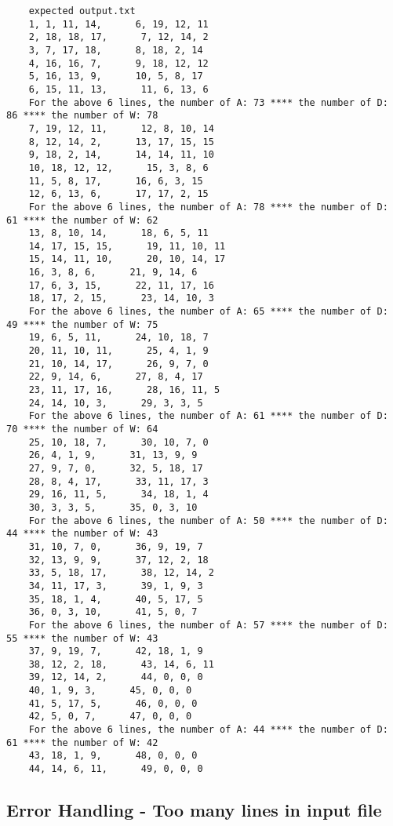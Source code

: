 \documentclass[]{article}
\begin{document}
	\begin{lstlisting}
	expected output.txt
	1, 1, 11, 14,      6, 19, 12, 11
	2, 18, 18, 17,      7, 12, 14, 2
	3, 7, 17, 18,      8, 18, 2, 14
	4, 16, 16, 7,      9, 18, 12, 12
	5, 16, 13, 9,      10, 5, 8, 17
	6, 15, 11, 13,      11, 6, 13, 6
	For the above 6 lines, the number of A: 73 **** the number of D: 86 **** the number of W: 78
	7, 19, 12, 11,      12, 8, 10, 14
	8, 12, 14, 2,      13, 17, 15, 15
	9, 18, 2, 14,      14, 14, 11, 10
	10, 18, 12, 12,      15, 3, 8, 6
	11, 5, 8, 17,      16, 6, 3, 15
	12, 6, 13, 6,      17, 17, 2, 15
	For the above 6 lines, the number of A: 78 **** the number of D: 61 **** the number of W: 62
	13, 8, 10, 14,      18, 6, 5, 11
	14, 17, 15, 15,      19, 11, 10, 11
	15, 14, 11, 10,      20, 10, 14, 17
	16, 3, 8, 6,      21, 9, 14, 6
	17, 6, 3, 15,      22, 11, 17, 16
	18, 17, 2, 15,      23, 14, 10, 3
	For the above 6 lines, the number of A: 65 **** the number of D: 49 **** the number of W: 75
	19, 6, 5, 11,      24, 10, 18, 7
	20, 11, 10, 11,      25, 4, 1, 9
	21, 10, 14, 17,      26, 9, 7, 0
	22, 9, 14, 6,      27, 8, 4, 17
	23, 11, 17, 16,      28, 16, 11, 5
	24, 14, 10, 3,      29, 3, 3, 5
	For the above 6 lines, the number of A: 61 **** the number of D: 70 **** the number of W: 64
	25, 10, 18, 7,      30, 10, 7, 0
	26, 4, 1, 9,      31, 13, 9, 9
	27, 9, 7, 0,      32, 5, 18, 17
	28, 8, 4, 17,      33, 11, 17, 3
	29, 16, 11, 5,      34, 18, 1, 4
	30, 3, 3, 5,      35, 0, 3, 10
	For the above 6 lines, the number of A: 50 **** the number of D: 44 **** the number of W: 43
	31, 10, 7, 0,      36, 9, 19, 7
	32, 13, 9, 9,      37, 12, 2, 18
	33, 5, 18, 17,      38, 12, 14, 2
	34, 11, 17, 3,      39, 1, 9, 3
	35, 18, 1, 4,      40, 5, 17, 5
	36, 0, 3, 10,      41, 5, 0, 7
	For the above 6 lines, the number of A: 57 **** the number of D: 55 **** the number of W: 43
	37, 9, 19, 7,      42, 18, 1, 9
	38, 12, 2, 18,      43, 14, 6, 11
	39, 12, 14, 2,      44, 0, 0, 0
	40, 1, 9, 3,      45, 0, 0, 0
	41, 5, 17, 5,      46, 0, 0, 0
	42, 5, 0, 7,      47, 0, 0, 0
	For the above 6 lines, the number of A: 44 **** the number of D: 61 **** the number of W: 42
	43, 18, 1, 9,      48, 0, 0, 0
	44, 14, 6, 11,      49, 0, 0, 0
	\end{lstlisting}
	
	\newpage
	

\subsection{Error Handling - Too many lines in input file}
\end{document}

